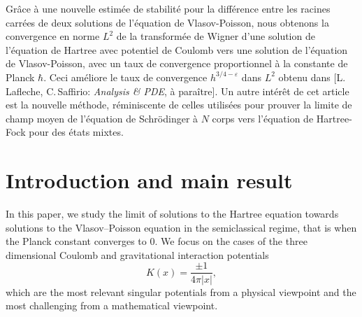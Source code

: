 \documentclass[JEP,XML,SOM,Unicode,NoEqCountersInSection,published]{cedram}
\theoremstyle{definition}
\let\lt\left
\let\rt\right
\renewcommand {\(} {\lt(}
\renewcommand {\)} {\rt)}
\newcommand {\n}[1] {\lt\lvert #1 \rt\rvert}
\begin{document}


\begin{altabstract}
Grâce à une nouvelle estimée de stabilité pour la différence entre les racines carrées de deux solutions de l'équation de Vlasov-Poisson, nous obtenons la convergence en norme $L^2$ de la transformée de Wigner d'une solution de l'équation de Hartree avec potentiel de Coulomb vers une solution de l'équation de Vlasov-Poisson, avec un taux de convergence proportionnel à la constante de Planck $\hbar$. Ceci améliore le taux de convergence $h^{3/4 - \varepsilon}$ dans $L^2$ obtenu dans [L.\,Lafleche, C.\,Saffirio: \textit{Analysis \& PDE}, à paraître]. Un autre intérêt de cet article est la nouvelle méthode, réminiscente de celles utilisées pour prouver la limite de champ moyen de l'équation de Schrödinger à $N$ corps vers l'équation de Hartree-Fock pour des états mixtes.
\end{altabstract}
\maketitle
\vspace*{-1.5\baselineskip}
\tableofcontents
\mainmatter

\vspace*{-4\baselineskip}\mbox{}
\section{Introduction and main result}

In this paper, we study the limit of solutions to the Hartree equation towards solutions to the Vlasov--Poisson equation in the semiclassical regime, that is when the Planck constant converges to $0$. We focus on the cases of the three dimensional Coulomb and gravitational interaction potentials
\begin{equation}\label{eq:K}
K(x) = \frac{\pm 1}{4\pi\n{x}},
\end{equation}
which are the most relevant singular potentials from a physical viewpoint and the most challenging from a mathematical viewpoint.
\end{document}
